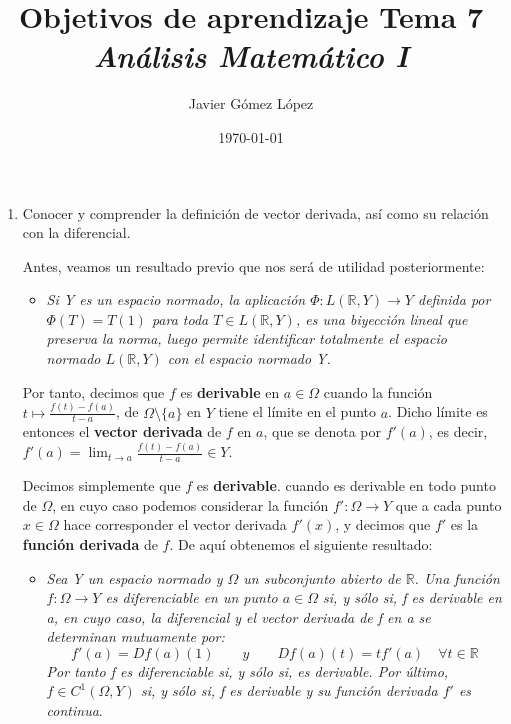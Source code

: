 \documentclass[a4paper, 12pt]{article}
\title{\textbf{Objetivos de aprendizaje Tema 7} \\ \textit{Análisis Matemático I}}
\author{Javier Gómez López}
\date{\today}
\begin{document}
\maketitle

\begin{enumerate}[label=\textbf{\arabic*}.]

\item Conocer y comprender la definición de vector derivada, así como su relación con la diferencial.

Antes, veamos un resultado previo que nos será de utilidad posteriormente:

\begin{itemize}
	\item \textit{Si Y es un espacio normado, la aplicación \(\Phi : L(\mathbb{R},Y) \to Y\) definida por \(\Phi (T) = T(1)\) para toda \(T \in L (\mathbb{R},Y)\), es una biyección lineal que preserva la norma, luego permite identificar totalmente el espacio normado \(L(\mathbb{R},Y)\) con el espacio normado Y.}
\end{itemize}

Por tanto, decimos que \(f\) es \textbf{derivable} en \(a \in \Omega\) cuando la función \(t \mapsto \frac{f(t) - f(a)}{t-a}\), de \(\Omega \setminus \{a\}\) en \(Y\) tiene el límite en el punto \(a\). Dicho límite es entonces el \textbf{vector derivada} de \(f\) en \(a\), que se denota por \(f'(a)\), es decir, \(f'(a) = \lim_{t \to a} \frac{f(t) - f(a)}{t-a} \in Y\).

Decimos simplemente que \(f\) es \textbf{derivable}. cuando es derivable en todo punto de \(\Omega\), en cuyo caso podemos considerar la función \(f':\Omega \to Y\) que a cada punto \(x \in \Omega\) hace corresponder el vector derivada \(f'(x)\), y decimos que \(f'\) es la \textbf{función derivada} de \(f\). De aquí obtenemos el siguiente resultado:

\begin{itemize}
	\item \textit{Sea Y un espacio normado y \(\Omega\) un subconjunto abierto de \(\mathbb{R}\). Una función \(f: \Omega \to Y\) es diferenciable en un punto \(a \in \Omega\) si, y sólo si, f es derivable en a, en cuyo caso, la diferencial y el vector derivada de f en a se determinan mutuamente por:}
	\[
	f '(a) = Df(a)(1) \qquad \textit{y} \qquad Df(a)(t) = t f'(a) \quad \forall t \in \mathbb{R}
	\]
	\textit{Por tanto f es diferenciable si, y sólo si, es derivable. Por último, \(f \in C^1 (\Omega, Y)\) si, y sólo si, f es derivable y su función derivada \(f'\) es continua}.
\end{itemize}


\end{enumerate}
\end{document}
